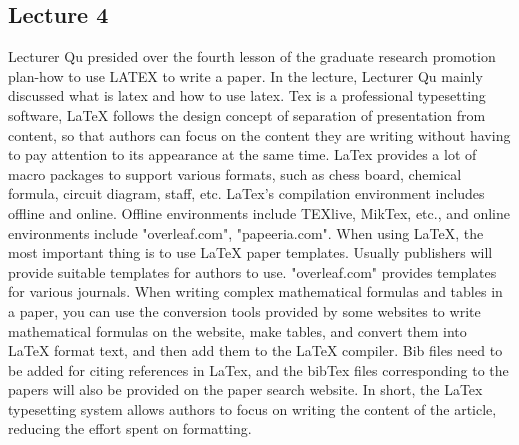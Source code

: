 \documentclass[UTF-8]{ctexart}
\begin{document}
\subsection{Lecture 4} 
Lecturer Qu presided over the fourth lesson of the graduate research promotion plan-how to use LATEX to write a paper. In the lecture, Lecturer Qu mainly discussed what is latex and how to use latex.
Tex is a professional typesetting software, LaTeX follows the design concept of separation of presentation from content, so that authors can focus on the content they are writing without having to pay attention to its appearance at the same time. LaTex provides a lot of macro packages to support various formats, such as chess board, chemical formula, circuit diagram, staff, etc. LaTex's compilation environment includes offline and online. Offline environments include TEXlive, MikTex, etc., and online environments include "overleaf.com", "papeeria.com".
When using LaTeX, the most important thing is to use LaTeX paper templates. Usually publishers will provide suitable templates for authors to use. "overleaf.com" provides templates for various journals. When writing complex mathematical formulas and tables in a paper, you can use the conversion tools provided by some websites to write mathematical formulas on the website, make tables, and convert them into LaTeX format text, and then add them to the LaTeX compiler. Bib files need to be added for citing references in LaTex, and the bibTex files corresponding to the papers will also be provided on the paper search website.
In short, the LaTex typesetting system allows authors to focus on writing the content of the article, reducing the effort spent on formatting.
\end{document}
